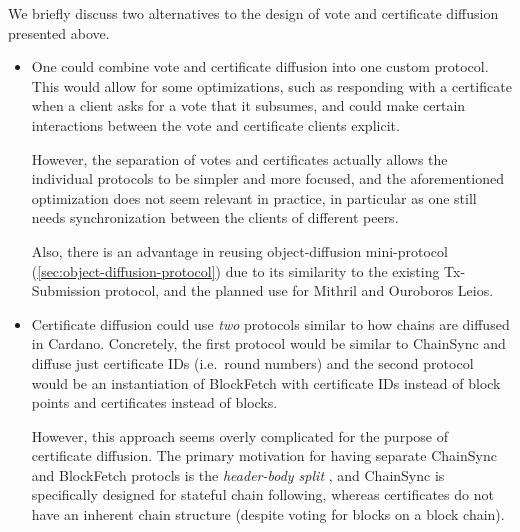We briefly discuss two alternatives to the design of vote and certificate diffusion presented above.
\begin{itemize}
\item
  One could combine vote and certificate diffusion into one custom protocol.
  This would allow for some optimizations, such as responding with a certificate when a client asks for a vote that it subsumes, and could make certain interactions between the vote and certificate clients explicit.

  However, the separation of votes and certificates actually allows the individual protocols to be simpler and more focused, and the aforementioned optimization does not seem relevant in practice, in particular as one still needs synchronization between the clients of different peers.

  Also, there is an advantage in reusing object-diffusion mini-protocol (\cref{sec:object-diffusion-protocol}) due to its similarity to the existing Tx-Submission protocol, and the planned use for Mithril \parencite{dmq-cip} and Ouroboros Leios.
\item
  Certificate diffusion could use \emph{two} protocols similar to how chains are diffused in Cardano.
  Concretely, the first protocol would be similar to ChainSync and diffuse just certificate IDs (i.e.\ round numbers) and the second protocol would be an instantiation of BlockFetch with certificate IDs instead of block points and certificates instead of blocks.

  However, this approach seems overly complicated for the purpose of certificate diffusion.
  The primary motivation for having separate ChainSync and BlockFetch protocls is the \emph{header-body split} \parencite{shelley-data-diffusion-networking}, and ChainSync is specifically designed for stateful chain following, whereas certificates do not have an inherent chain structure (despite voting for blocks on a block chain).
\end{itemize}


